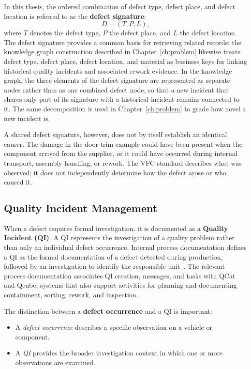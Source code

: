 In this thesis, the ordered combination of defect type, defect place, and
defect location is referred to as the \textbf{defect signature}:
\[
  D = (T, P, L),
\]
where $T$ denotes the defect type, $P$ the defect place, and $L$ the
defect location. The defect signature provides a common basis for
retrieving related records: the knowledge graph construction described in
Chapter~\ref{ch:problem} likewise treats defect type, defect place,
defect location, and material as business keys for linking historical
quality incidents and associated rework evidence. In the knowledge graph,
the three elements of the defect signature are represented as separate
nodes rather than as one combined defect node, so that a new incident that
shares only part of its signature with a historical incident remains
connected to it. The same decomposition is used in Chapter~\ref{ch:problem}
to grade how novel a new incident is.

A shared defect signature, however, does not by itself establish an
identical causer. The damage in the door-trim example could have been
present when the component arrived from the supplier, or it could have
occurred during internal transport, assembly handling, or rework. The VFC
standard describes what was observed; it does not independently determine
how the defect arose or who caused it.

\subsection{Quality Incident Management}\label{sec:fund_bmw_qi}

When a defect requires formal investigation, it is documented as a
\textbf{Quality Incident (QI)}. A QI represents the investigation of a
quality problem rather than only an individual defect occurrence. Internal
process documentation defines a QI as the formal documentation of a defect
detected during production, followed by an investigation to identify the
responsible unit~\cite{bmwint_frontdesk}. The relevant process documentation associates QI
creation, messages, and tasks with QCat and Qcube, systems that also
support activities for planning and documenting containment, sorting,
rework, and inspection.

The distinction between a \textbf{defect occurrence} and a QI is
important:

\begin{itemize}
  \item A \emph{defect occurrence} describes a specific observation on a
    vehicle or component.
  \item A \emph{QI} provides the broader investigation context in which
    one or more observations are examined.
\end{itemize}

